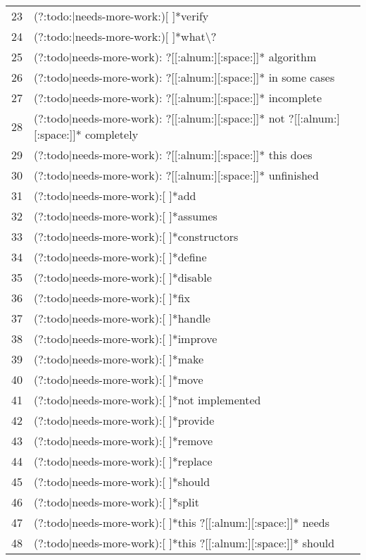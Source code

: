 \begin{longtable}{r|l}
23 & (?:todo:|needs-more-work:)[ ]*verify\\
24 & (?:todo:|needs-more-work:)[ ]*what\textbackslash{}?\\
25 & (?:todo|needs-more-work): ?[[:alnum:][:space:]]* algorithm\\
26 & (?:todo|needs-more-work): ?[[:alnum:][:space:]]* in some cases\\
27 & (?:todo|needs-more-work): ?[[:alnum:][:space:]]* incomplete\\
28 & (?:todo|needs-more-work): ?[[:alnum:][:space:]]* not ?[[:alnum:][:space:]]* completely\\
29 & (?:todo|needs-more-work): ?[[:alnum:][:space:]]* this does\\
30 & (?:todo|needs-more-work): ?[[:alnum:][:space:]]* unfinished\\
31 & (?:todo|needs-more-work):[ ]*add\\
32 & (?:todo|needs-more-work):[ ]*assumes\\
33 & (?:todo|needs-more-work):[ ]*constructors\\
34 & (?:todo|needs-more-work):[ ]*define\\
35 & (?:todo|needs-more-work):[ ]*disable\\
36 & (?:todo|needs-more-work):[ ]*fix\\
37 & (?:todo|needs-more-work):[ ]*handle\\
38 & (?:todo|needs-more-work):[ ]*improve\\
39 & (?:todo|needs-more-work):[ ]*make\\
40 & (?:todo|needs-more-work):[ ]*move\\
41 & (?:todo|needs-more-work):[ ]*not implemented\\
42 & (?:todo|needs-more-work):[ ]*provide\\
43 & (?:todo|needs-more-work):[ ]*remove\\
44 & (?:todo|needs-more-work):[ ]*replace\\
45 & (?:todo|needs-more-work):[ ]*should\\
46 & (?:todo|needs-more-work):[ ]*split\\
47 & (?:todo|needs-more-work):[ ]*this ?[[:alnum:][:space:]]* needs\\
48 & (?:todo|needs-more-work):[ ]*this ?[[:alnum:][:space:]]* should\\

\end{longtable}
